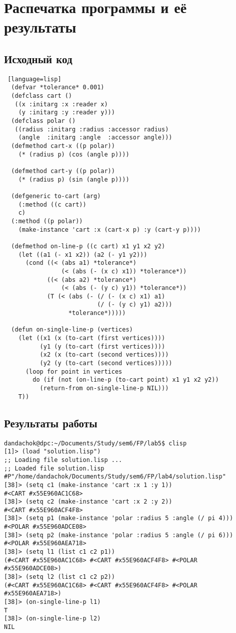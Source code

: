 \documentclass[12pt]{article}
\begin{document}
\pagebreak

\section{Распечатка программы и её результаты}
\subsection{Исходный код}
\begin{lstlisting} [language=lisp]
  (defvar *tolerance* 0.001)
  (defclass cart ()
   ((x :initarg :x :reader x)
    (y :initarg :y :reader y)))
  (defclass polar ()
   ((radius :initarg :radius :accessor radius)
    (angle  :initarg :angle  :accessor angle)))
  (defmethod cart-x ((p polar))
    (* (radius p) (cos (angle p))))
  
  (defmethod cart-y ((p polar))
    (* (radius p) (sin (angle p))))
  
  (defgeneric to-cart (arg)
    (:method ((c cart))
    c)
  (:method ((p polar))
    (make-instance 'cart :x (cart-x p) :y (cart-y p))))
  
  (defmethod on-line-p ((c cart) x1 y1 x2 y2)
    (let ((a1 (- x1 x2)) (a2 (- y1 y2)))
      (cond ((< (abs a1) *tolerance*) 
                (< (abs (- (x c) x1)) *tolerance*))
            ((< (abs a2) *tolerance*) 
                (< (abs (- (y c) y1)) *tolerance*))
            (T (< (abs (- (/ (- (x c) x1) a1) 
                          (/ (- (y c) y1) a2))) 
                  *tolerance*)))))
  
  (defun on-single-line-p (vertices)
    (let ((x1 (x (to-cart (first vertices)))) 
          (y1 (y (to-cart (first vertices))))
          (x2 (x (to-cart (second vertices))))
          (y2 (y (to-cart (second vertices)))))
      (loop for point in vertices
        do (if (not (on-line-p (to-cart point) x1 y1 x2 y2))
          (return-from on-single-line-p NIL)))
    T))
\end{lstlisting}

\subsection{Результаты работы}
\begin{lstlisting}
dandachok@dpc:~/Documents/Study/sem6/FP/lab5$ clisp
[1]> (load "solution.lisp")
;; Loading file solution.lisp ...
;; Loaded file solution.lisp
#P"/home/dandachok/Documents/Study/sem6/FP/lab4/solution.lisp"
[38]> (setq c1 (make-instance 'cart :x 1 :y 1))
#<CART #x55E960AC1C68>
[38]> (setq c2 (make-instance 'cart :x 2 :y 2))
#<CART #x55E960ACF4F8>
[38]> (setq p1 (make-instance 'polar :radius 5 :angle (/ pi 4)))
#<POLAR #x55E960ADCE08>
[38]> (setq p2 (make-instance 'polar :radius 5 :angle (/ pi 6)))
#<POLAR #x55E960AEA718>
[38]> (setq l1 (list c1 c2 p1))
(#<CART #x55E960AC1C68> #<CART #x55E960ACF4F8> #<POLAR #x55E960ADCE08>)
[38]> (setq l2 (list c1 c2 p2))
(#<CART #x55E960AC1C68> #<CART #x55E960ACF4F8> #<POLAR #x55E960AEA718>)
[38]> (on-single-line-p l1)
T
[38]> (on-single-line-p l2)
NIL
\end{lstlisting}
\end{document}
